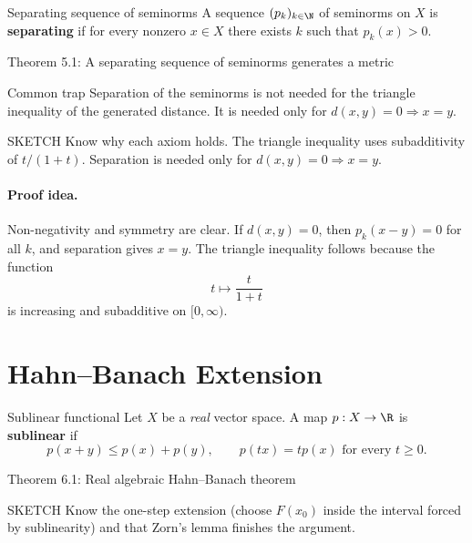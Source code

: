 \documentclass[header={Lecture 3 Exam Study Notes}]{study-note}
\begin{document}
\begin{defbox}{Separating sequence of seminorms}
A sequence $(p_k)_{k\in\N}$ of seminorms on $X$ is \textbf{separating} if for every nonzero $x\in X$ there exists $k$ such that $p_k(x)>0$.
\end{defbox}

\begin{thmbox}{Theorem 5.1: A separating sequence of seminorms generates a metric}
\thmFrechetMetric
\end{thmbox}

\begin{warningbox}{Common trap}
Separation of the seminorms is not needed for the triangle inequality of the generated distance. It is needed only for $d(x,y)=0\Rightarrow x=y$.
\end{warningbox}

\begin{prooflevelbox}{SKETCH}
Know why each axiom holds. The triangle inequality uses subadditivity of $t/(1+t)$. Separation is needed only for $d(x,y)=0\Rightarrow x=y$.
\end{prooflevelbox}

\paragraph{Proof idea.}
Non-negativity and symmetry are clear. If $d(x,y)=0$, then $p_k(x-y)=0$ for all $k$, and separation gives $x=y$. The triangle inequality follows because the function
\[
t\mapsto \frac{t}{1+t}
\]
is increasing and subadditive on $[0,\infty)$.

\section{Hahn--Banach Extension}

\begin{defbox}{Sublinear functional}
Let $X$ be a \emph{real} vector space. A map $p:X\to\R$ is \textbf{sublinear} if
\[
p(x+y)\le p(x)+p(y),
\qquad
p(t x)=t p(x) \text{ for every } t\ge 0.
\]
\end{defbox}

\begin{thmbox}{Theorem 6.1: Real algebraic Hahn--Banach theorem}
\thmHahnBanachReal
\end{thmbox}

\begin{prooflevelbox}{SKETCH}
Know the one-step extension (choose $F(x_0)$ inside the interval forced by sublinearity) and that Zorn's lemma finishes the argument.
\end{prooflevelbox}
\end{document}
